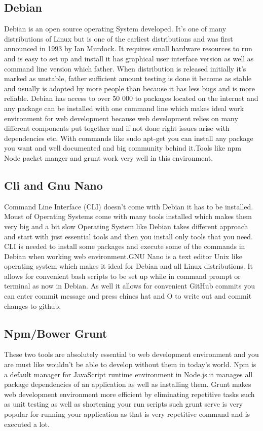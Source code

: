 \subsection{Debian}
\bigbreak
Debian is an open source operating System developed. It’s one of many distributions of Linux but is one of the earliest distributions and was first announced in 1993 by Ian Murdock. It requires small hardware resources to run and is easy to set up and install it has graphical user interface version as well as command line version which father. When distribution is released initially it’s marked as unstable, father sufficient amount testing is done it become as stable and usually is adopted by more people than because it has less bugs and is more reliable. Debian has access to over 50 000 to packages located on the internet and any package can be installed with one command line which makes ideal work environment for web development because web development relies on many different components put together and if not done right issues arise with dependencies etc. With commands like sudo apt-get you can install any package you want and well documented and big community behind it.Tools like npm Node packet manger and grunt work very well in this environment.

\subsection{Cli and Gnu Nano}
\bigbreak
Command Line Interface (CLI) doesn’t come with Debian it has to be installed. Moust of Operating Systems come with many tools installed which makes them very big and a bit slow Operating System like Debian takes different approach and start with just essential tools and then you install only tools that you need. CLI is needed to install some packages and execute some of the commands in Debian when working web environment.GNU Nano is a text editor Unix like operating system which makes it ideal for Debian and all Linux distributions. It allows for convenient bash scripts to be set up while in command prompt or terminal as now in Debian. As well it allows for convenient GitHub commits you can enter commit message and press chines hat and O to write out and commit changes to github.


\subsection{Npm/Bower Grunt}
\bigbreak
These two tools are absolutely essential to web development environment and you are must like wouldn’t be able to develop without them in today’s world. Npm is a default manager for JavaScript runtime environment in Node.js.it manages all package dependencies of an application as well as installing them. Grunt makes web development environment more efficient by eliminating repetitive tasks such as unit testing as well as shortening your run scripts such grunt serve is very popular for running your application as that is very repetitive command and is executed a lot.


